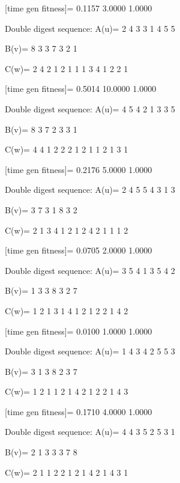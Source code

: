 [time gen fitness]=
    0.1157    3.0000    1.0000

Double digest sequence:
A(u)=
     2     4     3     3     1     4     5     5

B(v)=
     8     3     3     7     3     2     1

C(w)=
     2     4     2     1     2     1     1     1     3     4     1     2     2     1

[time gen fitness]=
    0.5014   10.0000    1.0000

Double digest sequence:
A(u)=
     4     5     4     2     1     3     3     5

B(v)=
     8     3     7     2     3     3     1

C(w)=
     4     4     1     2     2     2     1     2     1     1     2     1     3     1

[time gen fitness]=
    0.2176    5.0000    1.0000

Double digest sequence:
A(u)=
     2     4     5     5     4     3     1     3

B(v)=
     3     7     3     1     8     3     2

C(w)=
     2     1     3     4     1     2     1     2     4     2     1     1     1     2

[time gen fitness]=
    0.0705    2.0000    1.0000

Double digest sequence:
A(u)=
     3     5     4     1     3     5     4     2

B(v)=
     1     3     3     8     3     2     7

C(w)=
     1     2     1     3     1     4     1     2     1     2     2     1     4     2

[time gen fitness]=
    0.0100    1.0000    1.0000

Double digest sequence:
A(u)=
     1     4     3     4     2     5     5     3

B(v)=
     3     1     3     8     2     3     7

C(w)=
     1     2     1     1     2     1     4     2     1     2     2     1     4     3

[time gen fitness]=
    0.1710    4.0000    1.0000

Double digest sequence:
A(u)=
     4     4     3     5     2     5     3     1

B(v)=
     2     1     3     3     3     7     8

C(w)=
     2     1     1     2     2     1     2     1     4     2     1     4     3     1


